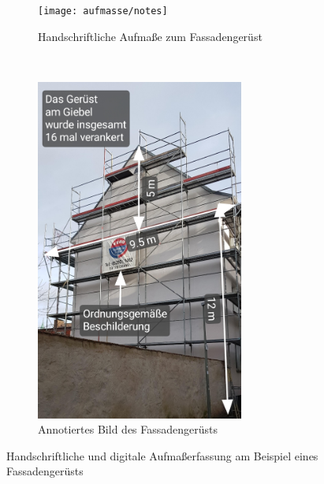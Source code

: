 \begin{figure}[h]
  \begin{subfigure}[t]{0.4\textwidth}
    \centering
    \texttt{[image: aufmasse/notes]}
    \caption{Handschriftliche Aufmaße zum Fassadengerüst}
    \label{fig:old}
  \end{subfigure}
  ~
  \begin{subfigure}[t]{0.4\textwidth}
    \centering
    \includegraphics[keepaspectratio, width=0.75\textwidth]{data/annotated}
    \caption{Annotiertes Bild des Fassadengerüsts}
    \label{fig:new}
  \end{subfigure}
  \centering
  \caption{Handschriftliche und digitale Aufmaßerfassung am Beispiel eines Fassadengerüsts}
  \label{fig:comparison}
\end{figure}

